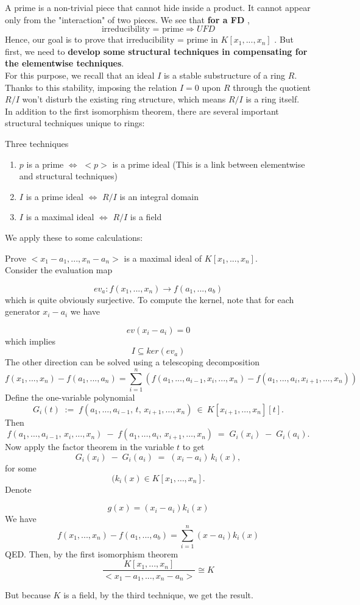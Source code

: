 \documentclass[11pt]{article}
\begin{document}
A prime is a non-trivial piece that cannot hide inside a product. It cannot appear only from the "interaction" of two pieces. We see that \textbf{for a FD} , 
$$
\text{irreducibility = prime}\Rightarrow UFD
$$
Hence,  our goal is to prove that $\text{irreducibility = prime}$ in $K[x_1,...,x_n]$ . But first, we need to \textbf{develop some structural techniques in compensating for the elementwise techniques}. \\

For this purpose,  we recall that an ideal $I$ is a stable substructure of a ring $R$. Thanks to this stability, imposing the relation $I=0$ upon $R$ through the quotient $R/I$  won't disturb the existing ring structure, which means $R/I$ is a ring itself. \\

In addition to the first isomorphism theorem, there are several important structural techniques unique to rings:
\begin{mybox}{Three techniques}
\begin{enumerate}
    \item $p$ is a prime $\Leftrightarrow $ $<p>$ is a prime ideal  (This is a link between elementwise and structural techniques) 
    \item $I$ is a prime ideal $\Leftrightarrow$ $R/I$ is an integral domain 
    \item $I$ is a maximal ideal $\Leftrightarrow$ $R/I$ is a field 
\end{enumerate}    
\end{mybox}
We apply these to some calculations:

\begin{mybox}
Prove $<x_1-a_1,...,x_n-a_n>$ is a maximal ideal of $K[x_1,...,x_n]$. \\

Consider the evaluation map 

$$
ev_a: f(x_1,...,x_n)\rightarrow f(a_1,...,a_b)
$$
which is quite obviously surjective. To compute the kernel, note that for each generator $x_i-a_i$ we have 

$$
ev(x_i-a_i)=0
$$
which implies 
$$
I\subseteq ker(ev_a)
$$
The other direction can be solved using a telescoping decomposition 
$$
f(x_1,...,x_n)-f(a_1,...,a_n)=\sum_{i=1}^n(f(a_1,...,a_{i-1},x_i,...,x_n)-f(a_1,...,a_{i},x_{i+1},...,x_n))
$$
Define the one-variable polynomial
\[
G_i(t)\;:=\; f(a_1,\dots,a_{i-1},\,t,\,x_{i+1},\dots,x_n)\ \in\ K[x_{i+1},\dots,x_n][t].
\]
Then
\[
f(a_1,\dots,a_{i-1},\,x_i,\dots,x_n)\;-\;f(a_1,\dots,a_i,\,x_{i+1},\dots,x_n)
\;=\; G_i(x_i)\;-\;G_i(a_i).
\]
Now apply the factor theorem in the variable \(t\) to get
\[
G_i(x_i)\;-\;G_i(a_i)\;=\;(x_i-a_i)\,k_i(x),
\]
for some \[(k_i(x)\in K[x_1,\dots,x_n]. \] Denote

$$
g(x)=(x_i-a_i)k_i(x)
$$
We have 
$$
f(x_1,...,x_n)-f(a_1,...,a_b)=\sum_{i=1}^n(x-a_i)k_i(x)
$$
QED. Then, by the first isomorphism theorem
    $$
    \frac{K[x_1,...,x_n]}{<x_1-a_1,...,x_n-a_n>}\cong K
    $$

But because $K$ is a field, by the third technique, we get the result. 


\end{mybox}
\end{document}

